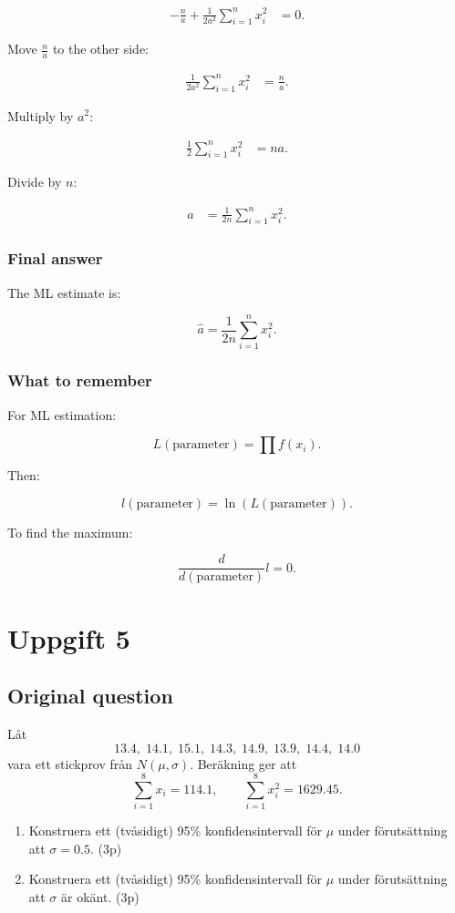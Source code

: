 \documentclass[10pt]{article}
\begin{document}
\begin{align*}
-\frac{n}{a}
+
\frac{1}{2a^2}
\sum_{i=1}^{n}x_i^2
&=0.
\end{align*}

Move \(\frac{n}{a}\) to the other side:

\begin{align*}
\frac{1}{2a^2}
\sum_{i=1}^{n}x_i^2
&=
\frac{n}{a}.
\end{align*}

Multiply by \(a^2\):

\begin{align*}
\frac{1}{2}
\sum_{i=1}^{n}x_i^2
&=
na.
\end{align*}

Divide by \(n\):

\begin{align*}
a
&=
\frac{1}{2n}
\sum_{i=1}^{n}x_i^2.
\end{align*}

\subsubsection*{Final answer}
The ML estimate is:

\[
\hat a
=
\frac{1}{2n}
\sum_{i=1}^{n}x_i^2.
\]

\subsubsection*{What to remember}
For ML estimation:

\[
L(\text{parameter})
=
\prod f(x_i).
\]

Then:

\[
l(\text{parameter})
=\ln(L(\text{parameter})).
\]

To find the maximum:

\[
\frac{d}{d(\text{parameter})}l=0.
\]

\section*{Uppgift 5}

\subsection*{Original question}
Låt
\[
13.4,\;14.1,\;15.1,\;14.3,\;14.9,\;13.9,\;14.4,\;14.0
\]
vara ett stickprov från \(N(\mu,\sigma)\).
Beräkning ger att
\[
\sum_{i=1}^{8}x_i=114.1,
\qquad
\sum_{i=1}^{8}x_i^2=1629.45.
\]

\begin{enumerate}[label=\alph*)]
\item Konstruera ett (tvåsidigt) 95\%
konfidensintervall för \(\mu\) under
förutsättning att \(\sigma=0.5\).
\hfill (3p)

\item Konstruera ett (tvåsidigt) 95\%
konfidensintervall för \(\mu\) under
förutsättning att \(\sigma\) är okänt.
\hfill (3p)
\end{enumerate}
\end{document}

